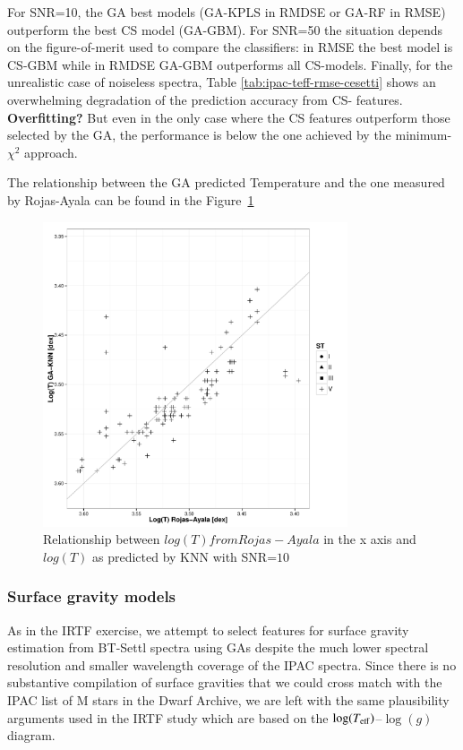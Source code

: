 For SNR=10, the GA best models (GA-KPLS in RMDSE or GA-RF in RMSE)
outperform the best CS model (GA-GBM). For SNR=50 the situation
depends on the figure-of-merit used to compare the classifiers: in
RMSE the best model is CS-GBM while in RMDSE GA-GBM outperforms all
CS-models. Finally, for the unrealistic case of noiseless spectra,
Table \ref{tab:ipac-teff-rmse-cesetti} shows an overwhelming
degradation of the prediction accuracy from CS- features. {\bf
Overfitting?} But even in the only case where the CS features
outperform those selected by the GA, the performance is below the one
achieved by the minimum-$\chi^2$ approach.


The relationship between the GA predicted Temperature and the one
measured by Rojas-Ayala can be found in the
Figure~\ref{fig:ipac_lt_lt}
\begin{figure}
 \begin{center}
 \includegraphics[width=9cm]{figs/ipac_LG_Trojas_Tknn_10.pdf}
 \caption{Relationship between $log(T) from Rojas-Ayala $ in the x axis 
 and $log(T)$ as predicted by KNN with SNR=$10$}
 \label{fig:ipac_lt_lt}
 \end{center}
\end{figure}

\subsubsection{Surface gravity models}

As in the IRTF exercise, we attempt to select features for surface
gravity estimation from BT-Settl spectra using GAs despite the much
lower spectral resolution and smaller wavelength coverage of the IPAC
spectra. Since there is no substantive compilation of surface
gravities that we could cross match with the IPAC list of M stars in
the Dwarf Archive, we are left with the same plausibility arguments
used in the IRTF study which are based on the $\log(T_{\rm
  eff})$--$\log(g)$ diagram.

